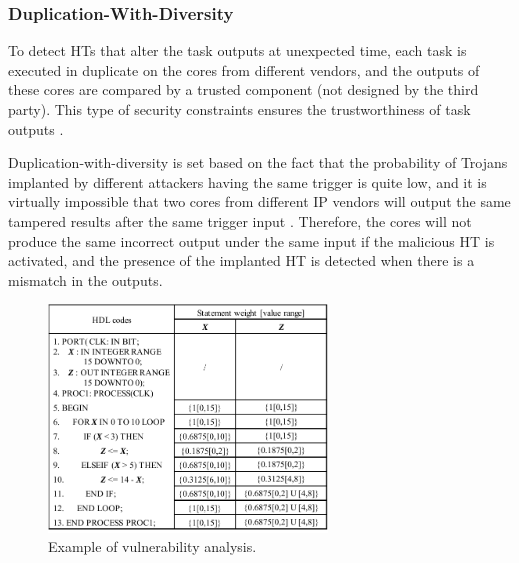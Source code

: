 \documentclass[10pt,journal, compsoc]{IEEEtran}
\begin{document}
\subsubsection{Duplication-With-Diversity}

To detect HTs that alter the task outputs at unexpected time, each task is executed in duplicate on the cores from different vendors, and the outputs of these cores are compared by a trusted component (not designed by the third party). This type of security constraints ensures the trustworthiness of task outputs \cite{conference:DG}.

Duplication-with-diversity is set based on the fact that the probability of Trojans implanted by different attackers having the same trigger is quite low, and it is virtually impossible that two cores from different IP vendors will output the same tampered results after the same trigger input \cite{article:NV}. Therefore, the cores will not produce the same incorrect output under the same input if the malicious HT is activated, and the presence of the implanted HT is detected when there is a mismatch in the outputs.

\begin{figure}[!t]
\centering
\includegraphics[width=7.4cm]{figure/sample_code_analysis.pdf}
\caption{Example of vulnerability analysis.}
\label{fig:sample_code_analysis}
\end{figure}
\end{document}
